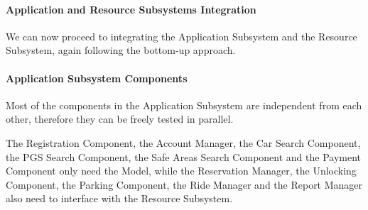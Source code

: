 \documentclass[english]{article}
\begin{document}
\paragraph{Application and Resource Subsystems Integration}
We can now proceed to integrating the Application Subsystem and the Resource Subsystem, again following the bottom-up approach.
\begin{figure}[H]
	\centering
\end{figure}

\paragraph{Application Subsystem Components}
Most of the components in the Application Subsystem are independent from each other, therefore they can be freely tested in parallel.

The Registration Component, the Account Manager, the Car Search Component, the PGS Search Component, the Safe Areas Search Component and the Payment Component only need the Model, while the Reservation Manager, the Unlocking Component, the Parking Component, the Ride Manager and the Report Manager also need to interface with the Resource Subsystem. 
\end{document}
